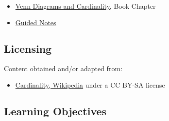 \begin{itemize}
    \item \href{https://mathresearch.utsa.edu/wikiFiles/MAT1053/Venn_Diagrams_and_Cardinality/MAT1053_M11.2Venn_Diagrams_and_Cardinality.pdf}{Venn Diagrams and Cardinality}, Book Chapter
    \item \href{https://mathresearch.utsa.edu/wikiFiles/MAT1053/Venn_Diagrams_and_Cardinality/MAT1053_M11.2Venn_Diagrams_and_CardinalityGN.pdf}{Guided Notes}
\end{itemize}


\subsection{Licensing}
\label{sss:lice-7352}




Content obtained and/or adapted from:



\begin{itemize}
    \item \href{https://en.wikipedia.org/wiki/Cardinality}{Cardinality, Wikipedia} under a CC BY-SA license
\end{itemize}


\subsection{Learning Objectives}
\label{ssec:lear-fe6e}


